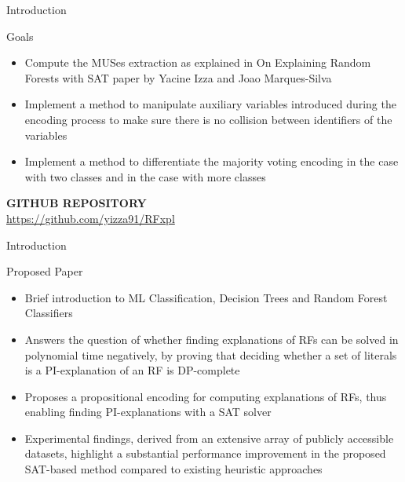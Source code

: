 \begin{frame}{Introduction}
    \begin{block}{Goals}
        \begin{itemize}
            \item Compute the MUSes extraction as explained in On Explaining Random Forests with SAT paper by Yacine Izza and Joao Marques-Silva
            \item Implement a method to manipulate auxiliary variables introduced during the encoding process to make sure there is no collision between identifiers of the variables
            \item Implement a method to differentiate the majority voting encoding in the case with two classes and in the case with more classes
        \end{itemize}
    \end{block}
    \vfill
    \begin{center}
        \fontsize{7}{10}\selectfont
        \textbf{GITHUB REPOSITORY}\\
        \url{https://github.com/yizza91/RFxpl}
    \end{center}
\end{frame}

\begin{frame}{Introduction}
    \begin{block}{Proposed Paper}
        \begin{itemize}
            \item Brief introduction to ML Classification, Decision Trees and Random Forest Classifiers
            \item Answers the question of whether finding explanations of RFs can be solved in polynomial time negatively, by proving that deciding whether a set of literals is a PI-explanation of an RF is DP-complete
            \item Proposes a propositional encoding for computing explanations of RFs, thus enabling finding PI-explanations with a SAT solver
            \item Experimental findings, derived from an extensive array of publicly accessible datasets, highlight a substantial performance improvement in the proposed SAT-based method compared to existing heuristic approaches
        \end{itemize}
    \end{block}
\end{frame}

